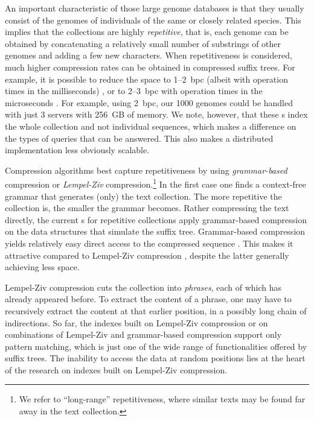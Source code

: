 An important characteristic of those large genome databases is that they
usually consist of the genomes of individuals of the same or closely related
species. This implies that the collections are highly \emph{repetitive}, that
is, each genome can be obtained by concatenating a relatively small number of
substrings of other genomes
and adding a few new characters. When repetitiveness is considered, much higher
compression rates can be obtained in compressed suffix trees. For example, it is possible to reduce
the space to 1--2~bpc (albeit with operation times in the milliseconds)
\cite{Abeliuk2013}, or to 2--3~bpc with operation times in the microseconds
\cite{Navarro2014}. For example, using 2~bpc, our 1000 genomes could be handled
with just 3 servers with 256~GB of memory. We note, however, that these \CST{}s index
the whole collection and not individual sequences, which makes a difference on
the types of queries that can be answered. This also makes a distributed
implementation less obviously scalable.

Compression algorithms best capture repetitiveness by using \emph{grammar-based}
compression or \emph{Lempel-Ziv} compression.\footnote{We refer to ``long-range''
repetitiveness, where similar texts may be found far away in the text
collection.} In the first case \cite{KY00,CLLPPSS05} one finds a context-free
grammar that generates (only) the text collection. The more repetitive the
collection is, the smaller the grammar becomes. Rather compressing the text directly,
the current \CST{}s for repetitive collections \cite{Abeliuk2013,Navarro2014}
apply grammar-based compression on the data structures that simulate the suffix tree.
Grammar-based compression yields relatively easy direct access to the compressed
sequence \cite{BLRSRW15}. This makes it attractive compared to Lempel-Ziv
compression \cite{ZL77}, despite the latter generally achieving less space.

Lempel-Ziv compression cuts the collection into \emph{phrases}, each of which
has already appeared before. To extract the content of a phrase, one may have
to recursively extract the content at that earlier position, in a possibly long
chain of indirections.
So far, the indexes built on Lempel-Ziv compression \cite{KN13} or on
combinations of Lempel-Ziv and grammar-based compression \cite{GGKNP12,GGKNP14,GP15}
support only pattern matching, which is just one of the wide range of
functionalities offered by suffix trees. The inability to access the data
at random positions lies at the heart of the research on indexes built on
Lempel-Ziv compression.

